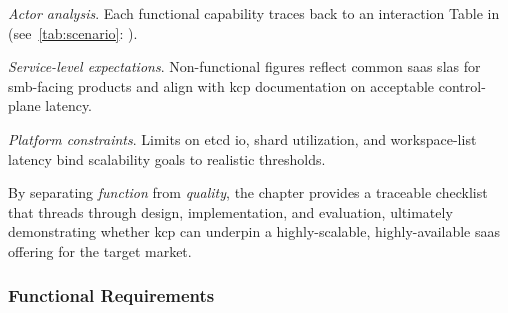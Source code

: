 \documentclass[11pt, a4paper, oneside, listof=totoc]{scrartcl}
\newcommand{\see}[1]{(see~\autoref{#1}: \textit{\nameref{#1}})}
\begin{document}
            \begin{enumerate}[label={[\arabic*]:},
                    ref=Challenge~\arabic*,
                    leftmargin=*,
                    itemsep=0.6\baselineskip]

                    \item\label{chal:actorAnalysis}
                        \textit{Actor analysis}.
                        Each functional capability traces back to an interaction Table in
                        \see{tab:scenario}.

                    \item\label{chal:slExpectations}
                        \textit{Service-level expectations}.
                        Non-functional figures reflect common \gls{saas} \glspl{sla} for
                        \gls{smb}-facing products and align with \gls{kcp} documentation on
                        acceptable control-plane latency.

                    \item\label{chal:platformConstraints}
                        \textit{Platform constraints}.
                        Limits on \gls{etcd} \gls{io}, shard utilization, and workspace-list latency
                        bind scalability goals to realistic thresholds.

            \end{enumerate}

            By separating \textit{function} from \textit{quality}, the chapter provides a traceable
            checklist that threads through design, implementation, and evaluation, ultimately
            demonstrating whether \gls{kcp} can underpin a highly-scalable, highly-available
            \gls{saas} offering for the target market.

            \subsubsection{Functional Requirements}\label{subsubsec:fr}
\end{document}
